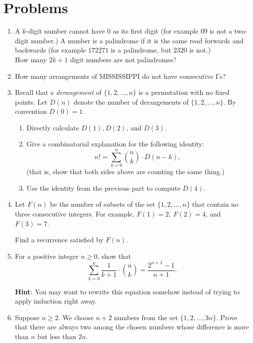 \documentclass[11pt]{article}
\begin{document}
\section{Problems}


\begin{enumerate}

\item A $k$-digit number cannot have $0$ as its first digit (for example $09$ is not a two-digit number.)  A number is a palindrome if it is the same read forwards and backwards (for example $172271$ is a palindrome, but $2320$ is not.)  \\
How many $2k+1$ digit numbers are not palindromes?
 
\item How many arrangements of MISSISSIPPI do not have consecutive I's?


\item Recall that a \emph{derangement} of $\{1,2,\ldots, n\}$ is a permutation with no fixed points.  Let $D(n)$ denote the number of derangements of $\{1,2,\ldots, n\}$.  By convention $D(0) = 1$.

\begin{enumerate}

\item Directly calculate $D(1), D(2)$, and $D(3)$.

\item Give a combinatorial explanation for the following identity:
\[
n! = \sum_{k=0}^n \binom{n}{k} \cdot D(n-k),
\]
(that is, show that both sides above are counting the same thing.)

\item Use the identity from the previous part to compute $D(4)$.

\end{enumerate}


\item Let $F(n)$ be the number of subsets of the set $\{1,2,\ldots, n\}$ that contain no three consecutive integers.  For example, $F(1) = 2,\ F(2) = 4$, and $F(3) = 7$.  

Find a recurrence satisfied by $F(n)$.

\item For a positive integer $n \ge 0$, show that
\[
\sum_{k=0}^n \frac{1}{k+1} \cdot \binom{n}{k} = \frac{2^{n+1}-1}{n+1}.
\]

{\bf Hint}: You may want to rewrite this equation somehow instead of trying to apply induction right away.

\item Suppose $n \ge 2$.  We choose $n+2$ numbers from the set $\{1,2,\ldots, 3n\}$.  Prove that there are always two among the chosen numbers whose difference is more than $n$ but less than $2n$.  


\end{enumerate}
\end{document}
